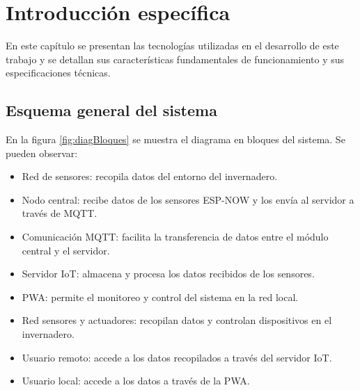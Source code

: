 \chapter{Introducción específica} %

\label{Chapter2}

En este capítulo se presentan las tecnologías utilizadas en el desarrollo de este trabajo y se detallan sus características fundamentales de funcionamiento y sus especificaciones técnicas.

\section{Esquema general del sistema}

En la figura \ref{fig:diagBloques} se muestra el diagrama en bloques del sistema. Se pueden observar:

\begin{itemize}
	\item Red de sensores: recopila datos del entorno del invernadero.
	\item Nodo central: recibe datos de los sensores ESP-NOW y los envía al servidor a través de MQTT.
	\item Comunicación MQTT: facilita la transferencia de datos entre el módulo central y el servidor.
	\item Servidor IoT: almacena y procesa los datos recibidos de los sensores.
	\item PWA: permite el monitoreo y control del sistema en la red local.
	\item Red sensores y actuadores: recopilan datos y controlan dispositivos en el invernadero.
	\item Usuario remoto: accede a los datos recopilados a través del servidor IoT.
	\item Usuario local: accede a los datos a través de la PWA.
\end{itemize}


